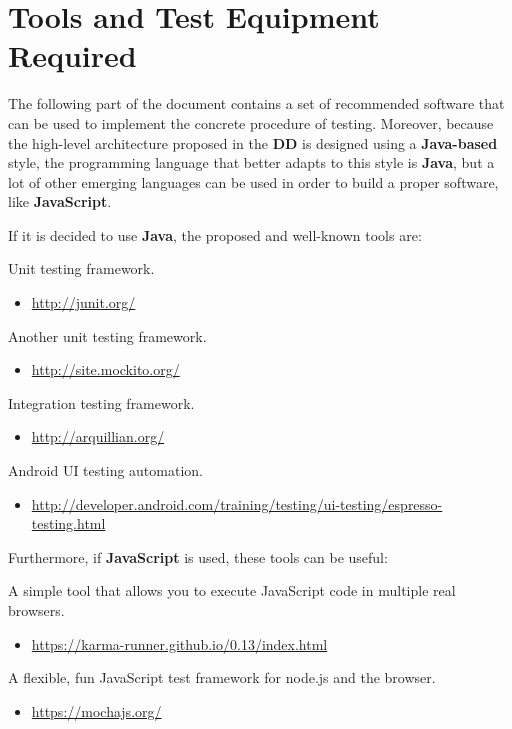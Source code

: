 \section{Tools and Test Equipment Required}
The following part of the document contains a set of recommended software that can be used to implement the concrete procedure of testing.
Moreover, because the high-level architecture proposed in the \textbf{DD} is designed using a \textbf{Java-based} style, the programming language that better adapts to this style is \textbf{Java}, but a lot of other emerging languages can be used in order to build a proper software, like \textbf{JavaScript}.\par
If it is decided to use \textbf{Java}, the proposed and well-known tools are:
\begin{itemize}	
	 Unit testing framework.
	\begin{itemize}
		\item 
		\href{http://junit.org/}{http://junit.org/}
	\end{itemize}	
	 Another unit testing framework.
	\begin{itemize}
		\item 
		\href{http://site.mockito.org/}{http://site.mockito.org/}
	\end{itemize}	
	 Integration testing framework.
	\begin{itemize}
		\item \href{http://arquillian.org/}{http://arquillian.org/}
	\end{itemize}
	 Android UI testing automation.
	\begin{itemize}
		\item \href{http://developer.android.com/training/testing/ui-testing/espresso-testing.html}{http://developer.android.com/training/testing/ui-testing/espresso-testing.html}
	\end{itemize}
\end{itemize}
Furthermore, if \textbf{JavaScript} is used, these tools can be useful:
\begin{itemize}
	 A simple tool that allows you to execute JavaScript code in multiple real browsers.
	\begin{itemize}
		\item \href{https://karma-runner.github.io/0.13/index.html}{https://karma-runner.github.io/0.13/index.html}
	\end{itemize}
	 A flexible, fun JavaScript test framework for node.js and the browser.
	\begin{itemize}
		\item \href{https://mochajs.org/}{https://mochajs.org/}
	\end{itemize}
\end{itemize}
